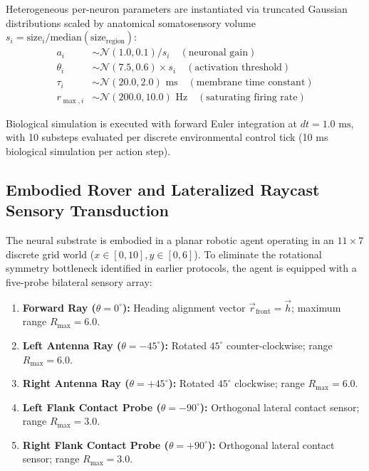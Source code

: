 \documentclass[10pt,letterpaper]{article}
\begin{document}
Heterogeneous per-neuron parameters are instantiated via truncated Gaussian distributions scaled by anatomical somatosensory volume $s_i = \text{size}_i / \text{median}(\text{size}_{\text{region}})$:
\begin{align}
a_i &\sim \mathcal{N}(1.0, 0.1) / s_i \quad (\text{neuronal gain}) \\
\theta_i &\sim \mathcal{N}(7.5, 0.6) \times s_i \quad (\text{activation threshold}) \\
\tau_i &\sim \mathcal{N}(20.0, 2.0)\text{ ms} \quad (\text{membrane time constant}) \\
r_{\max,i} &\sim \mathcal{N}(200.0, 10.0)\text{ Hz} \quad (\text{saturating firing rate})
\end{align}

Biological simulation is executed with forward Euler integration at $dt = 1.0\text{ ms}$, with 10 substeps evaluated per discrete environmental control tick (10 ms biological simulation per action step).

\subsection{Embodied Rover and Lateralized Raycast Sensory Transduction}

The neural substrate is embodied in a planar robotic agent operating in an $11 \times 7$ discrete grid world ($x \in [0, 10], y \in [0, 6]$). To eliminate the rotational symmetry bottleneck identified in earlier protocols, the agent is equipped with a five-probe bilateral sensory array:
\begin{enumerate}
    \item \textbf{Forward Ray ($\theta = 0^\circ$):} Heading alignment vector $\vec{r}_{\text{front}} = \vec{h}$; maximum range $R_{\max} = 6.0$.
    \item \textbf{Left Antenna Ray ($\theta = -45^\circ$):} Rotated $45^\circ$ counter-clockwise; range $R_{\max} = 6.0$.
    \item \textbf{Right Antenna Ray ($\theta = +45^\circ$):} Rotated $45^\circ$ clockwise; range $R_{\max} = 6.0$.
    \item \textbf{Left Flank Contact Probe ($\theta = -90^\circ$):} Orthogonal lateral contact sensor; range $R_{\max} = 3.0$.
    \item \textbf{Right Flank Contact Probe ($\theta = +90^\circ$):} Orthogonal lateral contact sensor; range $R_{\max} = 3.0$.
\end{enumerate}
\end{document}
